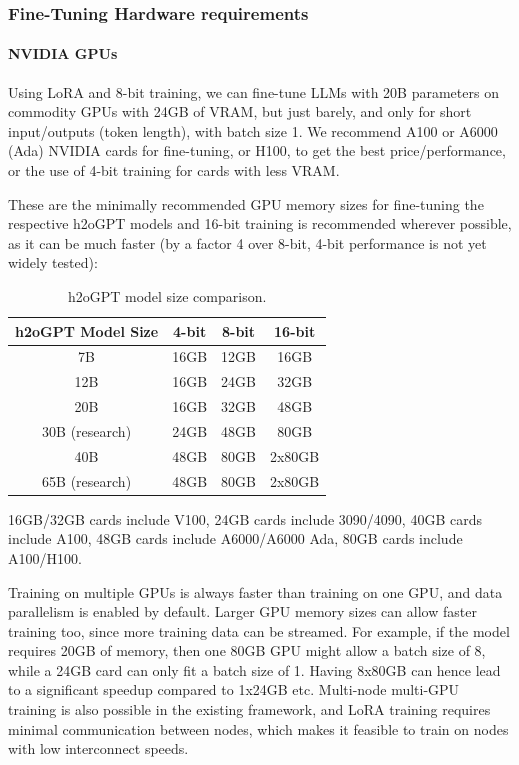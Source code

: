 \documentclass{article}
\begin{document}
\subsubsection{Fine-Tuning Hardware requirements}
\paragraph{NVIDIA GPUs}
Using LoRA and 8-bit training, we can fine-tune LLMs with 20B parameters on commodity GPUs with 24GB of VRAM, but just barely, and only for short input/outputs (token length), with batch size 1. We recommend A100 or A6000 (Ada) NVIDIA cards for fine-tuning, or H100, to get the best price/performance, or the use of 4-bit training for cards with less VRAM.

These are the minimally recommended GPU memory sizes for fine-tuning the respective h2oGPT models and 16-bit training is recommended wherever possible, as it can be much faster (by a factor 4 over 8-bit, 4-bit performance is not yet widely tested):

\begin{table}[h]
\centering
\begin{tabular}{ c c c c }
\toprule
\textbf{h2oGPT Model Size} & \textbf{4-bit} & \textbf{8-bit} & \textbf{16-bit} \\
\midrule
7B & 16GB & 12GB & 16GB \\

12B & 16GB & 24GB & 32GB\\

20B & 16GB & 32GB & 48GB\\

30B (research) & 24GB & 48GB & 80GB\\

40B & 48GB & 80GB & 2x80GB\\

65B (research) & 48GB & 80GB & 2x80GB\\
\bottomrule
\end{tabular}
\vspace{1mm}
\caption{h2oGPT model size comparison.}
\end{table}

16GB/32GB cards include V100, 24GB cards include 3090/4090, 40GB cards include A100, 48GB cards include A6000/A6000 Ada, 80GB cards include A100/H100.

Training on multiple GPUs is always faster than training on one GPU, and data parallelism is enabled by default. Larger GPU memory sizes can allow faster training too, since more training data can be streamed. For example, if the model requires 20GB of memory, then one 80GB GPU might allow a batch size of 8, while a 24GB card can only fit a batch size of 1. Having 8x80GB can hence lead to a significant speedup compared to 1x24GB etc. Multi-node multi-GPU training is also possible in the existing framework, and LoRA training requires minimal communication between nodes, which makes it feasible to train on nodes with low interconnect speeds.
\end{document}

